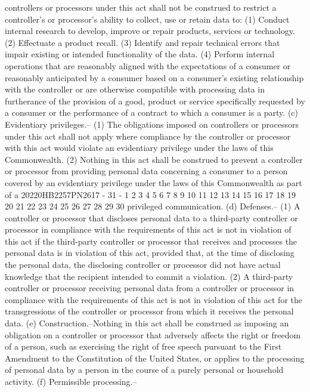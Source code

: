 controllers or processors under this act shall not be construed
to restrict a controller's or processor's ability to collect,
use or retain data to:
(1) Conduct internal research to develop, improve or
repair products, services or technology.
(2) Effectuate a product recall.
(3) Identify and repair technical errors that impair
existing or intended functionality of the data.
(4) Perform internal operations that are reasonably
aligned with the expectations of a consumer or reasonably
anticipated by a consumer based on a consumer's existing
relationship with the controller or are otherwise compatible
with processing data in furtherance of the provision of a
good, product or service specifically requested by a consumer
or the performance of a contract to which a consumer is a
party.
(c) Evidentiary privileges.--
(1) The obligations imposed on controllers or processors
under this act shall not apply where compliance by the
controller or processor with this act would violate an
evidentiary privilege under the laws of this Commonwealth.
(2) Nothing in this act shall be construed to prevent a
controller or processor from providing personal data
concerning a consumer to a person covered by an evidentiary
privilege under the laws of this Commonwealth as part of a
20220HB2257PN2617 - 31 -
1
2
3
4
5
6
7
8
9
10
11
12
13
14
15
16
17
18
19
20
21
22
23
24
25
26
27
28
29
30
privileged communication.
(d) Defenses.--
(1) A controller or processor that discloses personal
data to a third-party controller or processor in compliance
with the requirements of this act is not in violation of this
act if the third-party controller or processor that receives
and processes the personal data is in violation of this act,
provided that, at the time of disclosing the personal data,
the disclosing controller or processor did not have actual
knowledge that the recipient intended to commit a violation.
(2) A third-party controller or processor receiving
personal data from a controller or processor in compliance
with the requirements of this act is not in violation of this
act for the transgressions of the controller or processor
from which it receives the personal data.
(e) Construction.--Nothing in this act shall be construed as
imposing an obligation on a controller or processor that
adversely affects the right or freedom of a person, such as
exercising the right of free speech pursuant to the First
Amendment to the Constitution of the United States, or applies
to the processing of personal data by a person in the course of
a purely personal or household activity.
(f) Permissible processing.--
